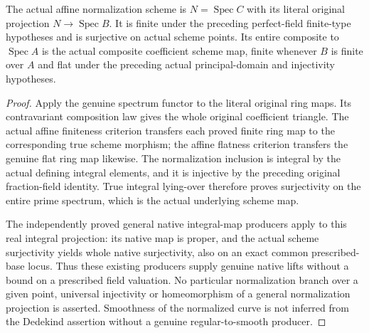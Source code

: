 \begin{theorem}
\label{scheme:actual-finite-flat-curve-normalization}
\leanok
{}
The actual affine normalization scheme is $N=\operatorname{Spec}C$
with its literal original projection $N\to\operatorname{Spec}B$.
It is finite under the preceding perfect-field finite-type hypotheses
and is surjective on actual scheme points. Its entire composite to
$\operatorname{Spec}A$ is the actual composite coefficient scheme map,
finite whenever $B$ is finite over $A$ and flat under the preceding
actual principal-domain and injectivity hypotheses.
\end{theorem}
\begin{proof}
Apply the genuine spectrum functor to the literal original ring maps.
Its contravariant composition law gives the whole original coefficient
triangle. The actual affine finiteness criterion transfers each proved
finite ring map to the corresponding true scheme morphism; the affine
flatness criterion transfers the genuine flat ring map likewise.
The normalization inclusion is integral by the actual defining integral
elements, and it is injective by the preceding original fraction-field
identity. True integral lying-over therefore proves surjectivity on
the entire prime spectrum, which is the actual underlying scheme map.

The independently proved general native integral-map producers apply
to this real integral projection: its native map is proper, and the
actual scheme surjectivity yields whole native surjectivity, also on
an exact common prescribed-base locus. Thus these existing producers
supply genuine native lifts without a bound on a prescribed field
valuation. No particular normalization branch over a given point,
universal injectivity or homeomorphism of a general normalization
projection is asserted. Smoothness of the normalized curve is not
inferred from the Dedekind assertion without a genuine regular-to-smooth
producer.
\end{proof}

